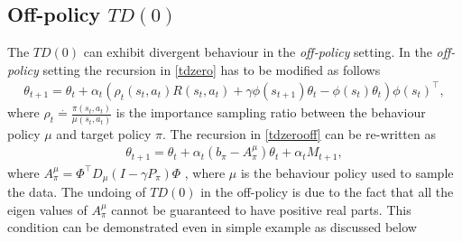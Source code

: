 \subsection{Off-policy $TD(0)$}
The $TD(0)$ can exhibit divergent behaviour in the \emph{off-policy} setting. In the \emph{off-policy} setting the recursion in \eqref{tdzero} has to be modified as follows
\begin{align}\label{tdzerooff}
\theta_{t+1}=\theta_t+\alpha_t(\rho_t(s_t,a_t){R(s_t,a_t)+\gamma \phi(s_{t+1})\theta_t-\phi(s_t)\theta_t}){\phi(s_t)}^\top,
\end{align}
where $\rho_t\stackrel{\cdot}{=}\frac{\pi(s_t,a_t)}{\mu(s_t,a_t)}$ is the importance sampling ratio between the behaviour policy $\mu$ and target policy $\pi$. The recursion in \eqref{tdzerooff} can be re-written as
\begin{align}\label{tdzerooffsa}
\theta_{t+1}=\theta_t+\alpha_t(b_\pi-A^\mu_\pi)\theta_t+\alpha_t M_{t+1},
\end{align}
where $A^{\mu}_\pi=\Phi^\top D_\mu (I-\gamma P_\pi)\Phi$ , where $\mu$ is the behaviour policy used to sample the data. The undoing of $TD(0)$ in the off-policy is due to the fact that all the eigen values of $A^\mu_\pi$ cannot be guaranteed to have positive real parts. This condition can be demonstrated even in simple example as discussed below
\begin{example}
\end{example}
